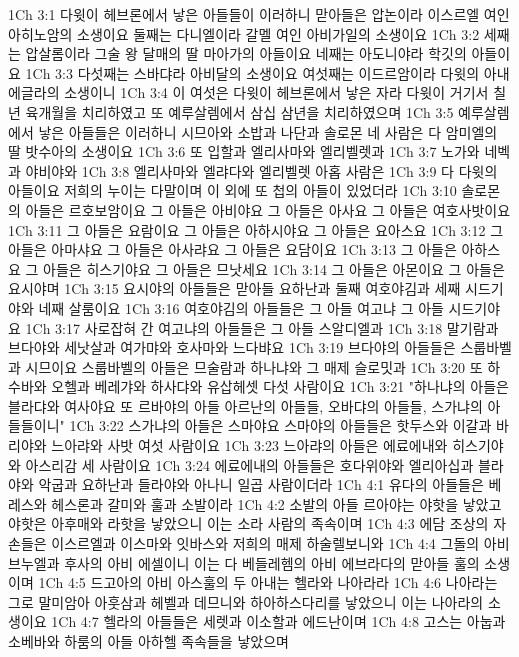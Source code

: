 1Ch 3:1  다윗이 헤브론에서 낳은 아들들이 이러하니 맏아들은 압논이라 이스르엘 여인 아히노암의 소생이요 둘째는 다니엘이라 갈멜 여인 아비가일의 소생이요
1Ch 3:2  세째는 압살롬이라 그술 왕 달매의 딸 마아가의 아들이요 네째는 아도니야라 학깃의 아들이요
1Ch 3:3  다섯째는 스바댜라 아비달의 소생이요 여섯째는 이드르암이라 다윗의 아내 에글라의 소생이니
1Ch 3:4  이 여섯은 다윗이 헤브론에서 낳은 자라 다윗이 거기서 칠년 육개월을 치리하였고 또 예루살렘에서 삼십 삼년을 치리하였으며
1Ch 3:5  예루살렘에서 낳은 아들들은 이러하니 시므아와 소밥과 나단과 솔로몬 네 사람은 다 암미엘의 딸 밧수아의 소생이요
1Ch 3:6  또 입할과 엘리사마와 엘리벨렛과
1Ch 3:7  노가와 네벡과 야비야와
1Ch 3:8  엘리사마와 엘랴다와 엘리벨렛 아홉 사람은
1Ch 3:9  다 다윗의 아들이요 저희의 누이는 다말이며 이 외에 또 첩의 아들이 있었더라
1Ch 3:10  솔로몬의 아들은 르호보암이요 그 아들은 아비야요 그 아들은 아사요 그 아들은 여호사밧이요
1Ch 3:11  그 아들은 요람이요 그 아들은 아하시야요 그 아들은 요아스요
1Ch 3:12  그 아들은 아마샤요 그 아들은 아사랴요 그 아들은 요담이요
1Ch 3:13  그 아들은 아하스요 그 아들은 히스기야요 그 아들은 므낫세요
1Ch 3:14  그 아들은 아몬이요 그 아들은 요시야며
1Ch 3:15  요시야의 아들들은 맏아들 요하난과 둘째 여호야김과 세째 시드기야와 네째 살룸이요
1Ch 3:16  여호야김의 아들들은 그 아들 여고냐 그 아들 시드기야요
1Ch 3:17  사로잡혀 간 여고냐의 아들들은 그 아들 스알디엘과
1Ch 3:18  말기람과 브다야와 세낫살과 여가먀와 호사마와 느다뱌요
1Ch 3:19  브다야의 아들들은 스룹바벨과 시므이요 스룹바벨의 아들은 므술람과 하나냐와 그 매제 슬로밋과
1Ch 3:20  또 하수바와 오헬과 베레갸와 하사댜와 유삽헤셋 다섯 사람이요
1Ch 3:21  "하나냐의 아들은 블라댜와 여사야요 또 르바야의 아들 아르난의 아들들, 오바댜의 아들들, 스가냐의 아들들이니"
1Ch 3:22  스가냐의 아들은 스마야요 스마야의 아들들은 핫두스와 이갈과 바리야와 느아랴와 사밧 여섯 사람이요
1Ch 3:23  느아랴의 아들은 에료에내와 히스기야와 아스리감 세 사람이요
1Ch 3:24  에료에내의 아들들은 호다위야와 엘리아십과 블라야와 악굽과 요하난과 들라야와 아나니 일곱 사람이더라
1Ch 4:1  유다의 아들들은 베레스와 헤스론과 갈미와 훌과 소발이라
1Ch 4:2  소발의 아들 르아야는 야핫을 낳았고 야핫은 아후매와 라핫을 낳았으니 이는 소라 사람의 족속이며
1Ch 4:3  에담 조상의 자손들은 이스르엘과 이스마와 잇바스와 저희의 매제 하술렐보니와
1Ch 4:4  그돌의 아비 브누엘과 후사의 아비 에셀이니 이는 다 베들레헴의 아비 에브라다의 맏아들 훌의 소생이며
1Ch 4:5  드고아의 아비 아스훌의 두 아내는 헬라와 나아라라
1Ch 4:6  나아라는 그로 말미암아 아훗삼과 헤벨과 데므니와 하아하스다리를 낳았으니 이는 나아라의 소생이요
1Ch 4:7  헬라의 아들들은 세렛과 이소할과 에드난이며
1Ch 4:8  고스는 아눕과 소베바와 하룸의 아들 아하헬 족속들을 낳았으며
